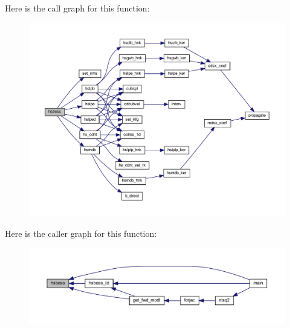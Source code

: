 Here is the call graph for this function\+:\nopagebreak
\begin{figure}[H]
\begin{center}
\leavevmode
\includegraphics[width=350pt]{Leroi_8f90_a940c66015c19ed9dab8214acf582b96c_cgraph}
\end{center}
\end{figure}
Here is the caller graph for this function\+:\nopagebreak
\begin{figure}[H]
\begin{center}
\leavevmode
\includegraphics[width=350pt]{Leroi_8f90_a940c66015c19ed9dab8214acf582b96c_icgraph}
\end{center}
\end{figure}
\mbox{\label{Leroi_8f90_a9b871caa6fa2f7ceadf6860a0a16a07b}} 
